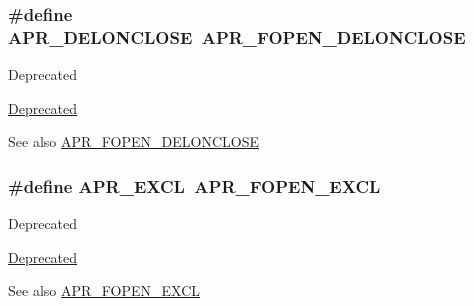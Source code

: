 \subsubsection[{\texorpdfstring{A\+P\+R\+\_\+\+D\+E\+L\+O\+N\+C\+L\+O\+SE}{APR_DELONCLOSE}}]{\setlength{\rightskip}{0pt plus 5cm}\#define A\+P\+R\+\_\+\+D\+E\+L\+O\+N\+C\+L\+O\+SE~{\bf A\+P\+R\+\_\+\+F\+O\+P\+E\+N\+\_\+\+D\+E\+L\+O\+N\+C\+L\+O\+SE}}\hypertarget{group__apr__file__open__flags_gaebc7f034a72dffe64858b1b9451994ff}{}\label{group__apr__file__open__flags_gaebc7f034a72dffe64858b1b9451994ff}
\begin{DoxyRefDesc}{Deprecated}
\item[\hyperlink{deprecated__deprecated000032}{Deprecated}]\end{DoxyRefDesc}
\begin{DoxySeeAlso}{See also}
\hyperlink{group__apr__file__open__flags_ga5d3756f6d242c667ed1d3f54af4916eb}{A\+P\+R\+\_\+\+F\+O\+P\+E\+N\+\_\+\+D\+E\+L\+O\+N\+C\+L\+O\+SE} 
\end{DoxySeeAlso}
\subsubsection[{\texorpdfstring{A\+P\+R\+\_\+\+E\+X\+CL}{APR_EXCL}}]{\setlength{\rightskip}{0pt plus 5cm}\#define A\+P\+R\+\_\+\+E\+X\+CL~{\bf A\+P\+R\+\_\+\+F\+O\+P\+E\+N\+\_\+\+E\+X\+CL}}\hypertarget{group__apr__file__open__flags_ga209c26b2b903cc23417f6781d4edf891}{}\label{group__apr__file__open__flags_ga209c26b2b903cc23417f6781d4edf891}
\begin{DoxyRefDesc}{Deprecated}
\item[\hyperlink{deprecated__deprecated000030}{Deprecated}]\end{DoxyRefDesc}
\begin{DoxySeeAlso}{See also}
\hyperlink{group__apr__file__open__flags_gabb7fb062cdf1d58faee8c7ea518496f1}{A\+P\+R\+\_\+\+F\+O\+P\+E\+N\+\_\+\+E\+X\+CL} 
\end{DoxySeeAlso}
